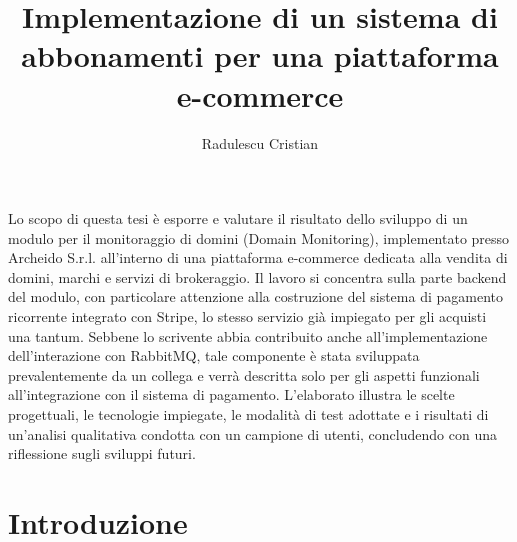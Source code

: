 \documentclass[target=bach,aauheader=,style=]{thud}
\title{Implementazione di un sistema di abbonamenti per una piattaforma e-commerce}
\author{Radulescu Cristian}
\begin{document}
\maketitle

\abstract

Lo scopo di questa tesi è esporre e valutare il risultato dello sviluppo di un modulo per il monitoraggio di domini (Domain Monitoring), implementato presso Archeido S.r.l. all'interno di una
piattaforma e-commerce dedicata alla vendita di domini, marchi e servizi di brokeraggio.
Il lavoro si concentra sulla parte backend del modulo, con particolare attenzione alla costruzione del sistema di pagamento ricorrente integrato con Stripe, lo stesso servizio già impiegato per gli
acquisti una tantum. Sebbene lo scrivente abbia contribuito anche all'implementazione dell'interazione con RabbitMQ, tale componente è stata sviluppata prevalentemente da un collega e verrà descritta
solo per gli aspetti funzionali all'integrazione con il sistema di pagamento. L'elaborato illustra le scelte progettuali, le tecnologie impiegate, le modalità di test adottate e i risultati di
un'analisi qualitativa condotta con un campione di utenti, concludendo con una riflessione sugli sviluppi futuri.

\tableofcontents

\listoffigures


\mainmatter


\chapter{Introduzione}
\end{document}
